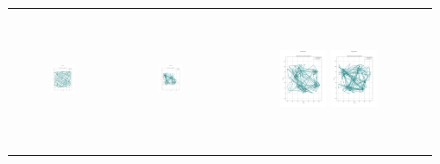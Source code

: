 \begin{figure}[p]
\begin{tabular}{ccc}
        \includegraphics[height=36mm,width=0.24\textwidth]{Images/simulation_no_obs/straight_paths/11.png}
        & \includegraphics[height=36mm,width=0.24\textwidth]{Images/simulation_no_obs/straight_paths/12.png}
        & \includegraphics[height=36mm,width=0.24\textwidth]{Images/simulation_no_obs/straight_paths/13.png}
        \includegraphics[height=36mm,width=0.24\textwidth]{Images/simulation_no_obs/straight_paths/14.png}\\[-4pt]


\end{tabular}
\end{figure}
